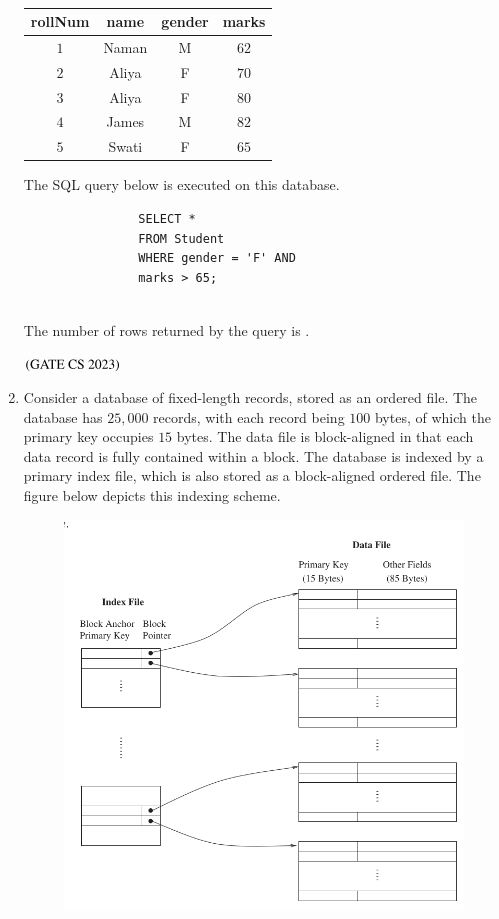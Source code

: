 \documentclass[journal,12pt,onecolumn]{IEEEtran}
\theoremstyle{remark}
\begin{document}
\begin{enumerate}
			\begin{table}[h]
				\centering
				\caption*{}
				\label{tab:student}
				\begin{tabular}{|c|c|c|c|}
					\hline
					rollNum & name & gender & marks \\
					\hline
					$1$ & Naman & M & $62$ \\
					\hline
					$2$ & Aliya & F & $70$ \\
					\hline
					$3$ & Aliya & F & $80$ \\
					\hline
					$4$ & James & M & $82$ \\
					\hline
					$5$ & Swati & F & $65$ \\
					\hline
				\end{tabular}
			\end{table}
The SQL query below is executed on this database.	
			\begin{verbatim}
				SELECT *
				FROM Student
				WHERE gender = 'F' AND
				marks > 65;
				
			\end{verbatim}
			
			The number of rows returned by the query is \underline{\hspace{2cm}}.
			
			\hfill $\left(\text{GATE CS 2023}\right)$
			
			\item Consider a database of fixed-length records, stored as an ordered file. The database has $25{,}000$ records, with each record being $100$ bytes, of which the primary key occupies $15$ bytes. The data file is block-aligned in that each data record is fully contained within a block. The database is indexed by a primary index file, which is also stored as a block-aligned ordered file. The figure below depicts this indexing scheme.
			\begin{figure}[H]
				\centering
				\includegraphics[width=0.7\linewidth]{figs/screenshot019}
				\caption{}
				\label{fig:screenshot019}
			\end{figure}
			

\end{enumerate}
\end{document}
